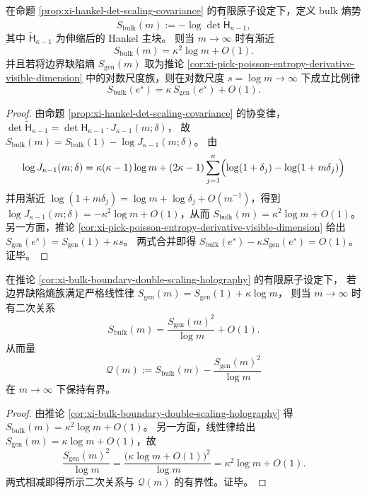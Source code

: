 
\begin{corollary}\label{cor:xi-bulk-boundary-double-scaling-holography}
在命题 \ref{prop:xi-hankel-det-scaling-covariance} 的有限原子设定下，定义 bulk 熵势
\[
S_{\mathrm{bulk}}(m):=-\log\det \widetilde{\mathsf H}_{\kappa-1},
\]
其中 \(\widetilde{\mathsf H}_{\kappa-1}\) 为伸缩后的 Hankel 主块。
则当 \(m\to\infty\) 时有渐近
\[
\boxed{\;
S_{\mathrm{bulk}}(m)=\kappa^2\log m+O(1).\;}
\]
并且若将边界缺陷熵 \(S_{\mathrm{gen}}(m)\) 取为推论 \ref{cor:xi-pick-poisson-entropy-derivative-visible-dimension} 中的对数尺度族，则在对数尺度 \(s=\log m\to\infty\) 下成立比例律
\[
\boxed{\;
S_{\mathrm{bulk}}(e^{s})=\kappa\,S_{\mathrm{gen}}(e^{s})+O(1).\;}
\]
\end{corollary}
\begin{proof}
由命题 \ref{prop:xi-hankel-det-scaling-covariance} 的协变律，
\(
\det \widetilde{\mathsf H}_{\kappa-1}=\det \mathsf H_{\kappa-1}\cdot J_{\kappa-1}(m;\delta)
\)，
故
\(
S_{\mathrm{bulk}}(m)=S_{\mathrm{bulk}}(1)-\log J_{\kappa-1}(m;\delta)
\)。
由
\[
\log J_{\kappa-1}(m;\delta)
=\kappa(\kappa-1)\log m
+(2\kappa-1)\sum_{j=1}^{\kappa}\Bigl(\log(1+\delta_j)-\log(1+m\delta_j)\Bigr)
\]
并用渐近 \(\log(1+m\delta_j)=\log m+\log\delta_j+O(m^{-1})\)，得到
\(
\log J_{\kappa-1}(m;\delta)=-\kappa^2\log m+O(1)
\)，从而
\(
S_{\mathrm{bulk}}(m)=\kappa^2\log m+O(1)
\)。
另一方面，推论 \ref{cor:xi-pick-poisson-entropy-derivative-visible-dimension} 给出
\(
S_{\mathrm{gen}}(e^s)=S_{\mathrm{gen}}(1)+\kappa s
\)。
两式合并即得
\(
S_{\mathrm{bulk}}(e^s)-\kappa S_{\mathrm{gen}}(e^s)=O(1)
\)。证毕。
\end{proof}

\begin{corollary}\label{cor:xi-bulk-boundary-quadratic-closure-audit}
在推论 \ref{cor:xi-bulk-boundary-double-scaling-holography} 的有限原子设定下，
若边界缺陷熵族满足严格线性律
\(
S_{\mathrm{gen}}(m)=S_{\mathrm{gen}}(1)+\kappa\log m
\)，
则当 \(m\to\infty\) 时有二次关系
\[
\boxed{\;
S_{\mathrm{bulk}}(m)
=\frac{S_{\mathrm{gen}}(m)^2}{\log m}+O(1).\;}
\]
从而量
\[
\mathcal Q(m):=S_{\mathrm{bulk}}(m)-\frac{S_{\mathrm{gen}}(m)^2}{\log m}
\]
在 \(m\to\infty\) 下保持有界。
\end{corollary}
\begin{proof}
由推论 \ref{cor:xi-bulk-boundary-double-scaling-holography} 得
\(
S_{\mathrm{bulk}}(m)=\kappa^2\log m+O(1)
\)。
另一方面，线性律给出
\(
S_{\mathrm{gen}}(m)=\kappa\log m+O(1)
\)，故
\[
\frac{S_{\mathrm{gen}}(m)^2}{\log m}
=\frac{\bigl(\kappa\log m+O(1)\bigr)^2}{\log m}
=\kappa^2\log m+O(1).
\]
两式相减即得所示二次关系与 \(\mathcal Q(m)\) 的有界性。证毕。
\end{proof}

